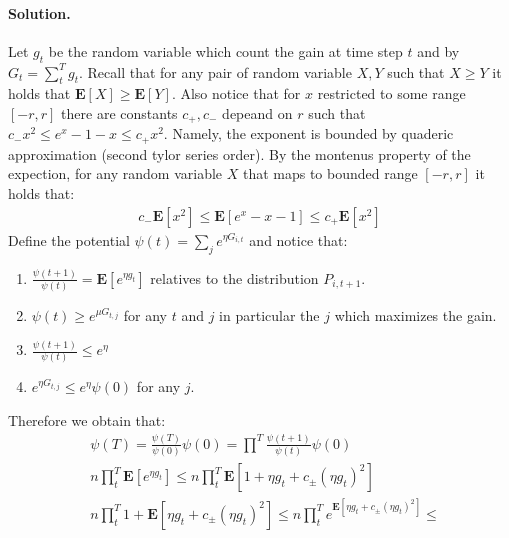 \documentclass{article}
\newcommand{\expp}[1]{ \mathbf{E} \left[ {#1} \right]}
\begin{document}
\begin{multicols*}{2}
  \paragraph{Solution.}
  Let $g_{t}$ be the random variable which count the gain at time step $t$ and by $G_{t} = \sum_{t}^{T}{g_{t}}$. Recall that for any pair of random variable $X,Y$ such that $X \ge Y$ it holds that $\expp{X} \ge \expp{Y}$. Also notice that for $x$ restricted to some range $[-r,r]$ there are constants $c_{+}, c_{-}$ depeand on $r$ such that $c_{-}x^{2} \le e^{x} - 1 - x \le c_{+}x^{2}$. Namely, the exponent is bounded by quaderic approximation (second tylor series order). By the montenus property of the expection, for any random variable $X$ that maps to bounded range $[-r,r]$ it holds that:
  \begin{equation*}
    \begin{split}
      c_{-}\expp{x^{2}}\le \expp{e^{x} - x - 1} \le c_{+}\expp{x^{2}}
    \end{split}
  \end{equation*}
  Define the potential $\psi\left( t \right) =  \sum_{j}{ e^{\eta G_{i,t}}}$ and notice that:
    \begin{enumerate}
      \item $ \frac{\psi\left( t+1 \right)}{\psi\left( t \right)} = \expp{e^{\eta g_{t}}}$ relatives to the distribution $P_{i,t+1}$. 
      \item $ \psi\left( t \right) \ge e^{\mu G_{t,j}} $ for any $t$ and $j$ in particular the $j$ which maximizes the gain. 
      \item $ \frac{\psi\left( t+1 \right)}{\psi\left( t \right)} \le e^{\eta}$
      \item $ e^{\eta G_{t,j}} \le e^{\eta} \psi\left( 0 \right)$ for any $j$.
    \end{enumerate}
Therefore we obtain that: 
\begin{equation*}
  \begin{split}
    & \psi\left( T \right) =  \frac{\psi\left( T \right)}{\psi\left( 0 \right)}\psi\left( 0 \right) = \prod^{T}{\frac{\psi\left( t+1 \right)}{\psi\left( t \right)} }\psi\left( 0 \right) \\
  & n \prod^{T}_{t}{\expp{ e^{\eta g_{t}} }}\le n \prod^{T}_{t}{\expp{ 1 + \eta g_{t} + c_{\pm}\left( \eta g_{t} \right)^{2} }} \\
& n \prod^{T}_{t}{ 1 + \expp{ \eta g_{t} + c_{\pm}\left( \eta g_{t} \right)^{2} }} \le  
 n \prod^{T}_{t}{ e^{\expp{ \eta g_{t} + c_{\pm}\left( \eta g_{t} \right)^{2} }}} \le \\ 

\end{split}
\end{equation*}
\end{multicols*}
\end{document}
